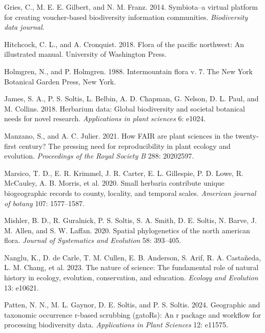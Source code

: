 \documentclass[
]{article}
\newlength{\cslhangindent}
\newenvironment{CSLReferences}[2] %
 {\begin{list}{}{%
  \setlength{\itemindent}{0pt}
  \setlength{\leftmargin}{0pt}
  \setlength{\parsep}{0pt}
  \ifodd #1
   \setlength{\leftmargin}{\cslhangindent}
   \setlength{\itemindent}{-1\cslhangindent}
  \fi
  \setlength{\itemsep}{#2\baselineskip}}}
 {\end{list}}
\begin{document}
\begin{CSLReferences}{1}{1}
Gries, C., M. E. E. Gilbert, and N. M. Franz. 2014. Symbiota--a virtual
platform for creating voucher-based biodiversity information
communities. \emph{Biodiversity data journal}.

Hitchcock, C. L., and A. Cronquist. 2018. Flora of the pacific
northwest: An illustrated manual. University of Washington Press.

Holmgren, N., and P. Holmgren. 1988. Intermountain flora v. 7. The New
York Botanical Garden Press, New York.

James, S. A., P. S. Soltis, L. Belbin, A. D. Chapman, G. Nelson, D. L.
Paul, and M. Collins. 2018. Herbarium data: Global biodiversity and
societal botanical needs for novel research. \emph{Applications in plant
sciences} 6: e1024.

Manzano, S., and A. C. Julier. 2021. How FAIR are plant sciences in the
twenty-first century? The pressing need for reproducibility in plant
ecology and evolution. \emph{Proceedings of the Royal Society B} 288:
20202597.

Marsico, T. D., E. R. Krimmel, J. R. Carter, E. L. Gillespie, P. D.
Lowe, R. McCauley, A. B. Morris, et al. 2020. Small herbaria contribute
unique biogeographic records to county, locality, and temporal scales.
\emph{American journal of botany} 107: 1577--1587.

Mishler, B. D., R. Guralnick, P. S. Soltis, S. A. Smith, D. E. Soltis,
N. Barve, J. M. Allen, and S. W. Laffan. 2020. Spatial phylogenetics of
the north american flora. \emph{Journal of Systematics and Evolution}
58: 393--405.

Nanglu, K., D. de Carle, T. M. Cullen, E. B. Anderson, S. Arif, R. A.
Castañeda, L. M. Chang, et al. 2023. The nature of science: The
fundamental role of natural history in ecology, evolution, conservation,
and education. \emph{Ecology and Evolution} 13: e10621.

Patten, N. N., M. L. Gaynor, D. E. Soltis, and P. S. Soltis. 2024.
Geographic and taxonomic occurrence r-based scrubbing (gatoRs): An r
package and workflow for processing biodiversity data.
\emph{Applications in Plant Sciences} 12: e11575.


\end{CSLReferences}
\end{document}

